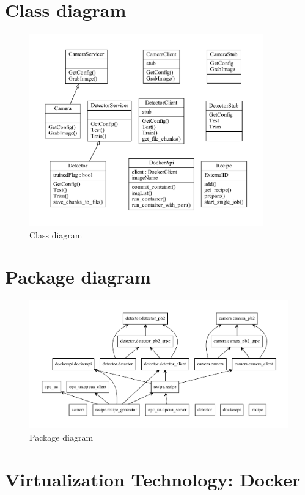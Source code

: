 \section{Class diagram}
\begin{figure}[ht]
	\centering
  \includegraphics[width=0.9\textwidth]{img/classes.pdf}
	\caption{Class diagram}
	\label{fig:Classes}
\end{figure}

\section{Package diagram}
\begin{figure}[ht]
	\centering
  \includegraphics[width=\textwidth]{img/packages.pdf}
	\caption{Package diagram}
	\label{fig:Packages}
\end{figure}

\section{Virtualization Technology: Docker}
